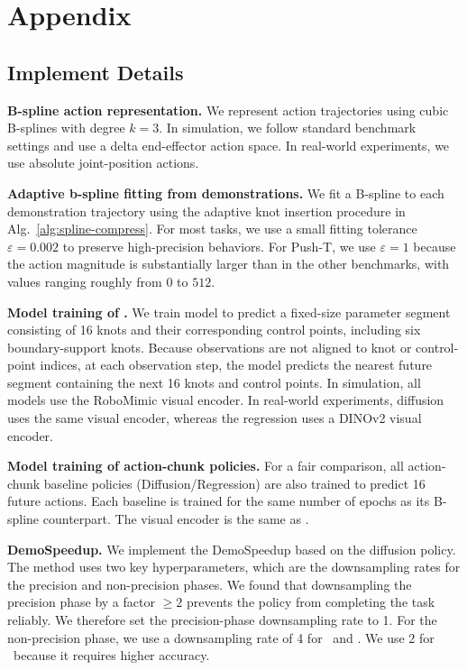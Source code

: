 \clearpage
\appendix
\section{Appendix}
\subsection{Implement Details}

\noindent\textbf{B-spline action representation. }
We represent action trajectories using cubic B-splines with degree $k=3$.
In simulation, we follow standard benchmark settings and use a delta end-effector action space.
In real-world experiments, we use absolute joint-position actions.

\noindent\textbf{Adaptive b-spline fitting from demonstrations. }
We fit a B-spline to each demonstration trajectory using the adaptive knot insertion procedure in Alg.~\ref{alg:spline-compress}.
For most tasks, we use a small fitting tolerance $\varepsilon=0.002$ to preserve high-precision behaviors.
For Push-T, we use $\varepsilon=1$ because the action magnitude is substantially larger than in the other benchmarks, with values ranging roughly from $0$ to $512$.

\noindent\textbf{Model training of \our.} 
We train \our model to predict a fixed-size parameter segment consisting of 16 knots and their corresponding control points, including six boundary-support knots.
Because observations are not aligned to knot or control-point indices, at each observation step, the model predicts the nearest future segment containing the next 16 knots and control points.
In simulation, all models use the RoboMimic visual encoder.
In real-world experiments, diffusion uses the same visual encoder, whereas the regression uses a DINOv2 visual encoder.

\noindent\textbf{Model training of action-chunk policies.} 
For a fair comparison, all action-chunk baseline policies (Diffusion/Regression) are also trained to predict 16 future actions.
Each baseline is trained for the same number of epochs as its B-spline counterpart.
The visual encoder is the same as \our.

\noindent\textbf{DemoSpeedup.} We implement the DemoSpeedup based on the diffusion policy. 
The method uses two key hyperparameters, which are the downsampling rates for the precision and non-precision phases.
We found that downsampling the precision phase by a factor $\ge 2$ prevents the policy from completing the task reliably.
We therefore set the precision-phase downsampling rate to 1.
For the non-precision phase, we use a downsampling rate of 4 for \pickcube\ and \cleantable.
We use 2 for \stackunstack\ because it requires higher accuracy.

